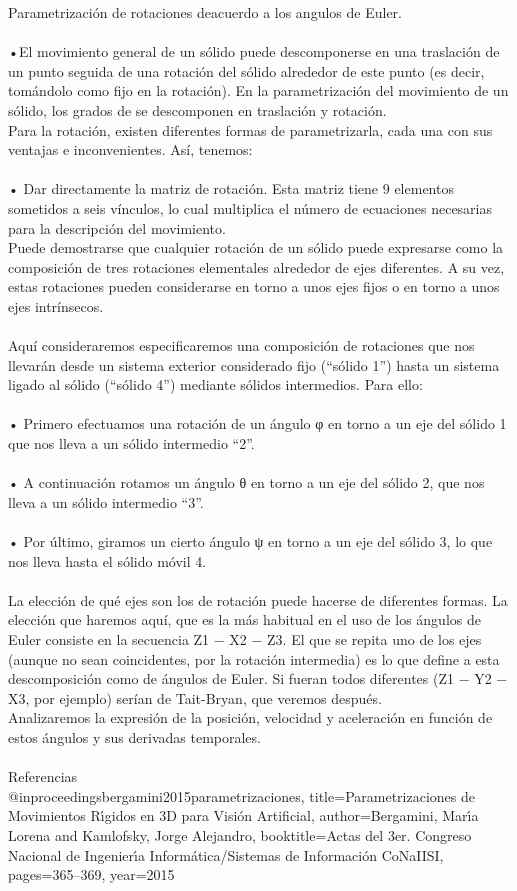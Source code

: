 \documentclass[12pt,a4paper]{article}
\begin{document}
Parametrización de rotaciones deacuerdo a los angulos de Euler.\\
\\
•El movimiento general de un sólido puede descomponerse en una traslación de un punto seguida de una rotación del sólido alrededor de este punto (es decir, tomándolo como fijo en la rotación). En la parametrización del movimiento de un sólido, los grados de se descomponen en traslación y rotación.\\
Para la rotación, existen diferentes formas de parametrizarla, cada una con sus ventajas e inconvenientes. Así, tenemos:\\
\\
•	Dar directamente la matriz de rotación. Esta matriz tiene 9 elementos sometidos a seis vínculos, lo cual multiplica el número de ecuaciones necesarias para la descripción del movimiento.\\
Puede demostrarse que cualquier rotación de un sólido puede expresarse como la composición de tres rotaciones elementales alrededor de ejes diferentes. A su vez, estas rotaciones pueden considerarse en torno a unos ejes fijos o en torno a unos ejes intrínsecos.\\
\\
Aquí consideraremos especificaremos una composición de rotaciones que nos llevarán desde un sistema exterior considerado fijo (“sólido 1”) hasta un sistema ligado al sólido (“sólido 4”) mediante sólidos intermedios. Para ello:\\
\\
•	Primero efectuamos una rotación de un ángulo φ en torno a un eje del sólido 1 que nos lleva a un sólido intermedio “2”.\\
\\
•	A continuación rotamos un ángulo θ en torno a un eje del sólido 2, que nos lleva a un sólido intermedio “3”.\\
\\
•	Por último, giramos un cierto ángulo ψ en torno a un eje del sólido 3, lo que nos lleva hasta el sólido móvil 4.\\
\\
La elección de qué ejes son los de rotación puede hacerse de diferentes formas. La elección que haremos aquí, que es la más habitual en el uso de los ángulos de Euler consiste en la secuencia Z1 − X2 − Z3. El que se repita uno de los ejes (aunque no sean coincidentes, por la rotación intermedia) es lo que define a esta descomposición como de ángulos de Euler. Si fueran todos diferentes (Z1 − Y2 − X3, por ejemplo) serían de Tait-Bryan, que veremos después.\\
Analizaremos la expresión de la posición, velocidad y aceleración en función de estos ángulos y sus derivadas temporales.\\
\\
Referencias\\
@inproceedings{bergamini2015parametrizaciones,
  title={Parametrizaciones de Movimientos R{\'\i}gidos en 3D para Visi{\'o}n Artificial},
  author={Bergamini, Mar{\'\i}a Lorena and Kamlofsky, Jorge Alejandro},
  booktitle={Actas del 3er. Congreso Nacional de Ingenier{\'\i}a Inform{\'a}tica/Sistemas de Informaci{\'o}n CoNaIISI},
  pages={365--369},
  year={2015}
}
\end{document}

